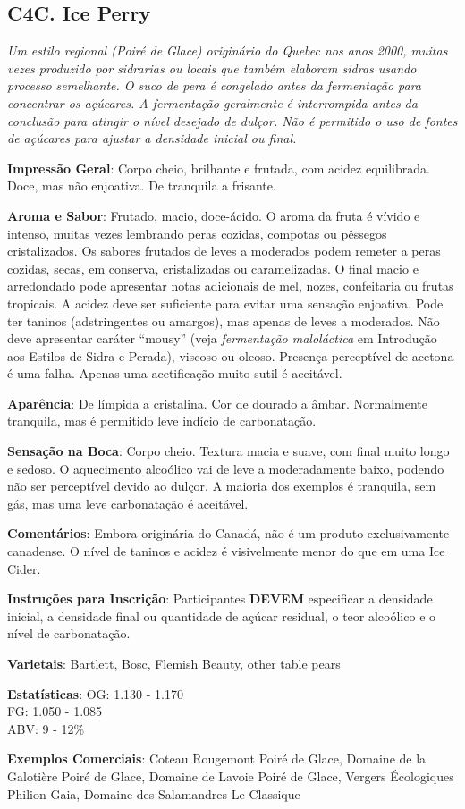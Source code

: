 \subsection*{C4C. Ice Perry}

\textit{Um estilo regional (\textit{Poiré de Glace}) originário do Quebec nos anos 2000, muitas vezes produzido por sidrarias ou locais que também elaboram sidras usando processo semelhante. O suco de pera é congelado antes da fermentação para concentrar os açúcares. A fermentação geralmente é interrompida antes da conclusão para atingir o nível desejado de dulçor. Não é permitido o uso de fontes de açúcares para ajustar a densidade inicial ou final.}

\textbf{Impressão Geral}: Corpo cheio, brilhante e frutada, com acidez equilibrada. Doce, mas não enjoativa. De tranquila a frisante.

\textbf{Aroma e Sabor}: Frutado, macio, doce-ácido. O aroma da fruta é vívido e intenso, muitas vezes lembrando peras cozidas, compotas ou pêssegos cristalizados. Os sabores frutados de leves a moderados podem remeter a peras cozidas, secas, em conserva, cristalizadas ou caramelizadas. O final macio e arredondado pode apresentar notas adicionais de mel, nozes, confeitaria ou frutas tropicais. A acidez deve ser suficiente para evitar uma sensação enjoativa. Pode ter taninos (adstringentes ou amargos), mas apenas de leves a moderados. Não deve apresentar caráter “mousy” (veja \textit{fermentação maloláctica} em Introdução aos Estilos de Sidra e Perada), viscoso ou oleoso. Presença perceptível de acetona é uma falha. Apenas uma acetificação muito sutil é aceitável.

\textbf{Aparência}: De límpida a cristalina. Cor de dourado a âmbar. Normalmente tranquila, mas é permitido leve indício de carbonatação.

\textbf{Sensação na Boca}: Corpo cheio. Textura macia e suave, com final muito longo e sedoso. O aquecimento alcoólico vai de leve a moderadamente baixo, podendo não ser perceptível devido ao dulçor. A maioria dos exemplos é tranquila, sem gás, mas uma leve carbonatação é aceitável.

\textbf{Comentários}: Embora originária do Canadá, não é um produto exclusivamente canadense. O nível de taninos e acidez é visivelmente menor do que em uma Ice Cider.

\textbf{Instruções para Inscrição}: Participantes \textbf{DEVEM} especificar a densidade inicial, a densidade final ou quantidade de açúcar residual, o teor alcoólico e o nível de carbonatação.

\textbf{Varietais}: Bartlett, Bosc, Flemish Beauty, other table pears

\textbf{Estatísticas}: OG: 1.130 - 1.170 \\
\phantom{ } \hspace{16.5mm} FG: 1.050 - 1.085 \\
\phantom{ } \hspace{16.5mm} ABV: 9 - 12\%

\textbf{Exemplos Comerciais}: Coteau Rougemont Poiré de Glace, Domaine de la Galotière Poiré de Glace, Domaine de Lavoie Poiré de Glace, Vergers Écologiques Philion Gaia, Domaine des Salamandres Le Classique
